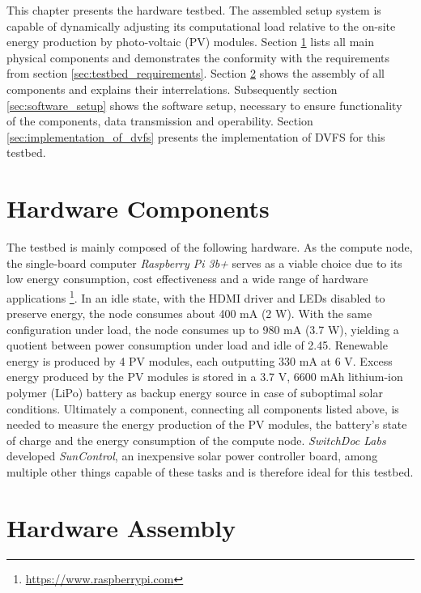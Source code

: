 This chapter presents the hardware testbed. The assembled setup system is
capable of dynamically adjusting its computational load relative to the on-site
energy production by photo-voltaic (PV) modules. Section
\ref{sec:hardware_components} lists all main physical components and
demonstrates the conformity with the requirements from section
\ref{sec:testbed_requirements}. Section \ref{sec:hardware_assembly} shows the
assembly of all components and explains their interrelations. Subsequently
section \ref{sec:software_setup} shows the software setup, necessary to ensure
functionality of the components, data transmission and operability. Section
\ref{sec:implementation_of_dvfs} presents the implementation of DVFS for this
testbed.

\section{Hardware Components}
\label{sec:hardware_components}

The testbed is mainly composed of the following hardware. As the compute node,
the single-board computer \emph{Raspberry Pi 3b+} serves as a viable choice due
to its low energy consumption, cost effectiveness and a wide range of hardware
applications \footnote{\url{https://www.raspberrypi.com}}. In an idle state,
with the \textsc{HDMI} driver and \textsc{LED}s disabled to preserve energy, the
node consumes about 400 mA (2 W). With the same configuration under load, the
node consumes up to 980 mA (3.7 W), yielding a quotient between power
consumption under load and idle of 2.45.
Renewable energy is produced by 4 PV modules, each outputting 330 mA at 6 V.
Excess energy produced by the PV modules is stored in a 3.7 V, 6600 mAh
lithium-ion polymer (LiPo) battery as backup energy source in case of suboptimal
solar conditions. Ultimately a component, connecting all components listed
above, is needed to measure the energy production of the PV modules, the
battery's state of charge and the energy consumption of the compute node.
\emph{SwitchDoc Labs} developed \emph{SunControl}, an inexpensive solar power
controller board, among multiple other things capable of these tasks
\cite{switchdoc_suncontrol} and is therefore ideal for this testbed.

\section{Hardware Assembly}
\label{sec:hardware_assembly}

